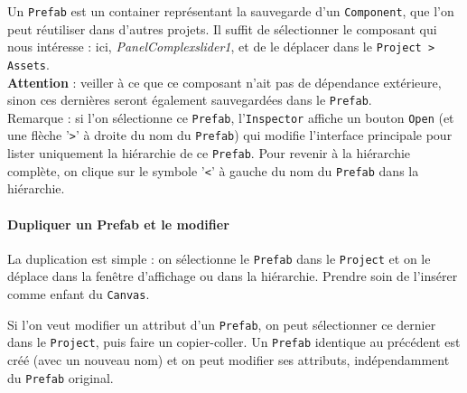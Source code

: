 \documentclass[a4paper,10pt]{article}
\newenvironment{solution}%
{\begin{tcolorbox}[breakable,colback=red!5!white,colframe=red!75!black,title=Solution]}%
{\end{tcolorbox}}
\begin{document}
\ifversionenseignant
\begin{solution}
Un \texttt{Prefab} est un container représentant la sauvegarde d'un \texttt{Component}, que l'on peut réutiliser dans d'autres projets.
Il suffit de sélectionner le composant qui nous intéresse : ici, \textit{PanelComplexslider1}, et de le déplacer dans le \texttt{Project > Assets}.\\

\textbf{Attention} : veiller à ce que ce composant n'ait pas de dépendance extérieure, sinon ces dernières seront également sauvegardées dans le \texttt{Prefab}.\\

Remarque : si l'on sélectionne ce \texttt{Prefab}, l'\texttt{Inspector} affiche un bouton \texttt{Open} (et une flèche '\texttt{>}' à droite du nom du \texttt{Prefab}) qui modifie l'interface principale pour lister uniquement la hiérarchie de ce \texttt{Prefab}. Pour revenir à la hiérarchie complète, on clique sur le symbole '\texttt{<}' à gauche du nom du \texttt{Prefab} dans la hiérarchie.

\paragraph{Dupliquer un Prefab et le modifier}

La duplication est simple : on sélectionne le \texttt{Prefab} dans le \texttt{Project} et on le déplace dans la fenêtre d'affichage ou dans la hiérarchie. Prendre soin de l'insérer comme enfant du \texttt{Canvas}.


Si l'on veut modifier un attribut d'un \texttt{Prefab}, on peut sélectionner ce dernier dans le \texttt{Project}, puis faire un copier-coller. Un \texttt{Prefab} identique au précédent est créé (avec un nouveau nom) et on peut modifier ses attributs, indépendamment du \texttt{Prefab} original.
	
\end{solution}
\fi 
	
\end{document}
